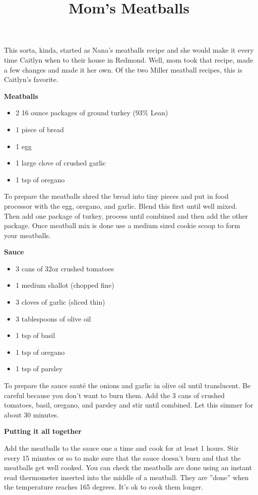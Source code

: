 \documentclass{article}
\title{Mom's Meatballs}
\begin{document}
This sorta, kinda, started as Nana's meatballs recipe and she would make it every time Caitlyn
when to their house in Redmond. Well, mom took that recipe, made a few changes and made it her
own. Of the two Miller meatball recipes, this is Caitlyn's favorite.

\textbf{Meatballs}

\begin{itemize}
    \item 2 16 ounce packages of ground turkey (93\% Lean)
    \item 1 piece of bread
    \item 1 egg
    \item 1 large clove of crushed garlic
    \item 1 tsp of oregano
\end{itemize}

To prepare the meatballs shred the bread into tiny pieces and put in food processor with the egg, oregano, and garlic.
Blend this first until well mixed. Then add one package of turkey, process until combined and then add the other package.
Once meatball mix is done use a medium sized cookie scoop to form your meatballs.

\textbf{Sauce}

\begin{itemize}
    \item 3 cans of 32oz crushed tomatoes
    \item 1 medium shallot (chopped fine)
    \item 3 cloves of garlic (sliced thin)
    \item 3 tablespoons of olive oil
    \item 1 tsp of basil
    \item 1 tsp of oregano
    \item 1 tsp of parsley
\end{itemize}

To prepare the sauce sauté the onions and garlic in olive oil until translucent. Be careful because you don't want to burn
them. Add the 3 cans of crushed tomatoes, basil, oregano, and parsley and stir until combined. Let this simmer for about 30
minutes.

\textbf{Putting it all together}

Add the meatballs to the sauce one a time and cook for at least 1 hours. Stir every 15 minutes or so to make
sure that the sauce doesn't burn and that the meatballs get well cooked. You can check the meatballs are done using
an instant read thermometer inserted into the middle of a meatball. They are ''done'' when the temperature reaches
165 degrees. It's ok to cook them longer.


\end{document}
